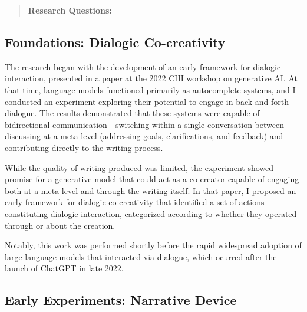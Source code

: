 \begin{quote}
\textbf{Research Questions:}


\end{quote}

\subsection{Foundations: Dialogic Co-creativity}

The research began with the development of an early framework for dialogic interaction, presented in a paper at the 2022 CHI workshop on generative AI. At that time, language models functioned primarily as autocomplete systems, and I conducted an experiment exploring their potential to engage in back-and-forth dialogue. The results demonstrated that these systems were capable of bidirectional communication—switching within a single conversation between discussing at a meta-level (addressing goals, clarifications, and feedback) and contributing directly to the writing process.

While the quality of writing produced was limited, the experiment showed promise for a generative model that could act as a co-creator capable of engaging both at a meta-level and through the writing itself. In that paper, I proposed an early framework for dialogic co-creativity that identified a set of actions constituting dialogic interaction, categorized according to whether they operated through or about the creation.

Notably, this work was performed shortly before the rapid widespread adoption of large language models that interacted via dialogue,  which ocurred after the launch of ChatGPT in late 2022.

\subsection{Early Experiments: Narrative Device}

